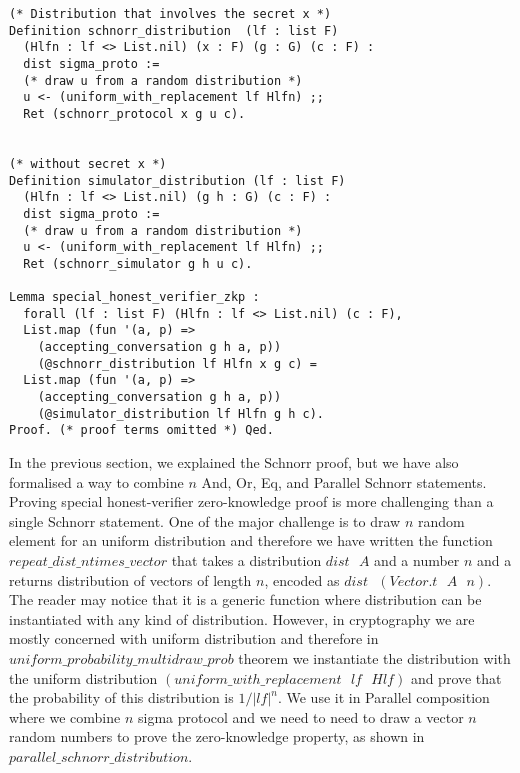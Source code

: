 \documentclass[conference,compsoc]{IEEEtran}
\begin{document}
\begin{lstlisting}[frame=single, language=Coq, caption={Definition of Natural Number},
  label={ind_nat},captionpos=t, basicstyle=\ttfamily\footnotesize,
  abovecaptionskip=-\medskipamount]
(* Distribution that involves the secret x *)
Definition schnorr_distribution  (lf : list F) 
  (Hlfn : lf <> List.nil) (x : F) (g : G) (c : F) : 
  dist sigma_proto :=
  (* draw u from a random distribution *)
  u <- (uniform_with_replacement lf Hlfn) ;;
  Ret (schnorr_protocol x g u c).

  
(* without secret x *)
Definition simulator_distribution (lf : list F) 
  (Hlfn : lf <> List.nil) (g h : G) (c : F) : 
  dist sigma_proto :=
  (* draw u from a random distribution *)
  u <- (uniform_with_replacement lf Hlfn) ;;
  Ret (schnorr_simulator g h u c).
  
Lemma special_honest_verifier_zkp : 
  forall (lf : list F) (Hlfn : lf <> List.nil) (c : F), 
  List.map (fun '(a, p) => 
    (accepting_conversation g h a, p))
    (@schnorr_distribution lf Hlfn x g c) = 
  List.map (fun '(a, p) => 
    (accepting_conversation g h a, p))
    (@simulator_distribution lf Hlfn g h c).
Proof. (* proof terms omitted *) Qed. 
\end{lstlisting}

In the previous section, we explained the Schnorr proof, 
but we have also formalised a way to combine $n$ And, Or, Eq, 
and Parallel Schnorr statements. Proving special 
honest-verifier zero-knowledge proof is more challenging 
than a single Schnorr statement. One of the major challenge 
is to draw $n$ random element for an uniform distribution 
and therefore we have written the function $repeat\_dist\_ntimes\_vector$
that takes a distribution $dist\text{ }A$ and a number $n$ and a returns 
distribution of vectors of length $n$,  encoded as 
$dist \text{ } (Vector.t \text{ } A \text{ } n)$. The 
reader may notice that it is a generic function 
where distribution can be instantiated with 
any kind of distribution. However, in cryptography 
we are mostly concerned with uniform distribution and  
therefore in $uniform\_probability\_multidraw\_prob$ theorem
we instantiate the distribution with 
the uniform distribution $(uniform\_with\_replacement\text{ }lf\text{ }Hlf)$ and 
prove that the probability of this distribution 
is $1/|lf|^n$. We use it 
in Parallel composition where we combine $n$ sigma protocol and  
we need to need to draw a vector $n$ random numbers to 
prove the zero-knowledge property, as shown 
in $parallel\_schnorr\_distribution$.
  
\end{document}
